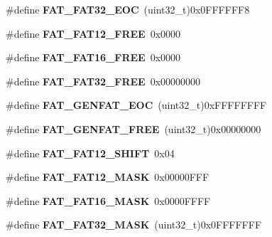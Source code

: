 \begin{DoxyCompactItemize}
\mbox{\label{group__libfs__dosfs_ga22095ef98d7b4e78b81700bef1129ad7}} 
\#define {\bfseries F\+A\+T\+\_\+\+F\+A\+T32\+\_\+\+E\+OC}~(uint32\+\_\+t)0x0\+F\+F\+F\+F\+F\+F8
\item 
\mbox{\label{group__libfs__dosfs_ga1297a55f8c3d15e1e25a27837014a351}} 
\#define {\bfseries F\+A\+T\+\_\+\+F\+A\+T12\+\_\+\+F\+R\+EE}~0x0000
\item 
\mbox{\label{group__libfs__dosfs_ga708a4827de3958bcbc0e9caa561e2bb8}} 
\#define {\bfseries F\+A\+T\+\_\+\+F\+A\+T16\+\_\+\+F\+R\+EE}~0x0000
\item 
\mbox{\label{group__libfs__dosfs_ga5f4507f12edba5f54c170f6011be23bf}} 
\#define {\bfseries F\+A\+T\+\_\+\+F\+A\+T32\+\_\+\+F\+R\+EE}~0x00000000
\item 
\mbox{\label{group__libfs__dosfs_ga850e11a49aa2fb5b3c97cef4b7d155f0}} 
\#define {\bfseries F\+A\+T\+\_\+\+G\+E\+N\+F\+A\+T\+\_\+\+E\+OC}~(uint32\+\_\+t)0x\+F\+F\+F\+F\+F\+F\+FF
\item 
\mbox{\label{group__libfs__dosfs_ga4e1b2522fcb184294fbf9f2712543925}} 
\#define {\bfseries F\+A\+T\+\_\+\+G\+E\+N\+F\+A\+T\+\_\+\+F\+R\+EE}~(uint32\+\_\+t)0x00000000
\item 
\mbox{\label{group__libfs__dosfs_ga7b1047ab96ed3ffe433cd1c18447db05}} 
\#define {\bfseries F\+A\+T\+\_\+\+F\+A\+T12\+\_\+\+S\+H\+I\+FT}~0x04
\item 
\mbox{\label{group__libfs__dosfs_ga8ca5c63fedb03b94123edc27282a2ad2}} 
\#define {\bfseries F\+A\+T\+\_\+\+F\+A\+T12\+\_\+\+M\+A\+SK}~0x00000\+F\+FF
\item 
\mbox{\label{group__libfs__dosfs_ga98005a54f900e0126dd26a8dcb35805f}} 
\#define {\bfseries F\+A\+T\+\_\+\+F\+A\+T16\+\_\+\+M\+A\+SK}~0x0000\+F\+F\+FF
\item 
\mbox{\label{group__libfs__dosfs_ga37ebeeacd3f93bf90061b635e2098621}} 
\#define {\bfseries F\+A\+T\+\_\+\+F\+A\+T32\+\_\+\+M\+A\+SK}~(uint32\+\_\+t)0x0\+F\+F\+F\+F\+F\+FF

\end{DoxyCompactItemize}
